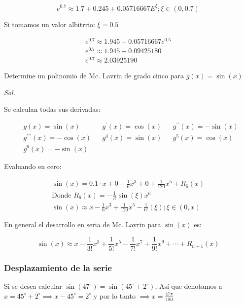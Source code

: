 \begin{equation*}
	e^0.7\approx1.7+0.245+0.05716667E^{\xi}; \xi\in (0,0.7)
\end{equation*}

Si tomamos un valor albitrrio: $\xi =0.5$

\begin{align*}
	e^0.7 \approx 1.945+0.05716667e^0.5 \\
	e^0.7 \approx 1.945+0.09425180      \\
	e^0.7 \approx 2.03925190
\end{align*}

\begin{example}
	Determine un polinomio de Mc. Lavrin de grado cinco para $g(x)=\sin(x)$
\end{example}

\textit{ Sol. }

Se calculan todas sus derivadas:

\begin{align*}
	 & g(x)=\sin(x)                       &  & g^{\prime}(x)=\cos(x) &  & g^{\prime\prime}(x)=-\sin(x) \\
	 & g^{\prime\prime\prime}(x)=-\cos(x) &  & g^4(x)=\sin(x)        &  & g^5(x)=\cos(x)               \\
	 & g^6(x)=-\sin(x)
\end{align*}

Evaluando en cero:

\begin{align*}
	\sin(x)=0.1\cdot x+0-\frac{1}{6}x^3+0+\frac{1}{120}x^5+R_6(x) \\
	\text{Donde } R_6(x)=-\frac{1}{7!}\sin(\xi)x^6                \\
	\sin(x)\approx x-\frac{1}{6}x^3+\frac{1}{120}x^5-\frac{1}{6!}(\xi); \xi \in (0,x)
\end{align*}

En general el desarrollo en seria de Mc. Lavrin para $\sin(x)$ es:

\begin{equation*}
	\sin(x)\approx x-\frac{1}{3!}x^3+\frac{1}{5!}x^5-\frac{1}{7!}x^7+\frac{1}{9!}x^9+\cdots+R_{n+1}(x)
\end{equation*}

\subsubsection{Desplazamiento de la serie}

Si se desea calcular $\sin(47^{\circ})=\sin(45^{\circ}+2^{\circ})$, Así que denotamos a $x=45^{\circ}+2^{\circ} \implies x-45^{\circ}=2^{\circ}$
y por lo tanto $\implies x=\frac{47\pi}{180}$

